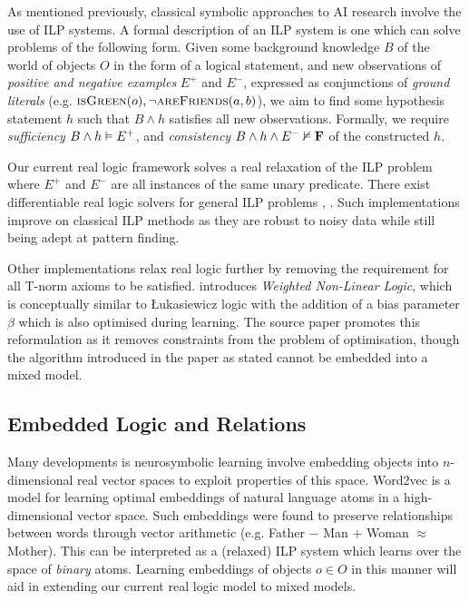 As mentioned previously, classical symbolic approaches to AI research involve the use of ILP systems. A formal description of an ILP system is one which can solve problems of the following form. Given some background knowledge $B$ of the world of objects $O$ in the form of a logical statement, and new observations of \textit{positive and negative examples} $E^+$ and $E^-$, expressed as conjunctions of \textit{ground literals} (e.g. $\textsc{isGreen}(o), \lnot \textsc{areFriends}(a,b)$), we aim to find some hypothesis statement $h$ such that $B \land h$ satisfies all new observations. Formally, we require \textit{sufficiency} $B \land h \vDash E^+$, and \textit{consistency} $B \land h \land E^- \nvDash \textbf{F}$ of the constructed $h$.

Our current real logic framework solves a real relaxation of the ILP problem where $E^+$ and $E^-$ are all instances of the same unary predicate. There exist differentiable real logic solvers for general ILP problems \cite{diffilp}, \cite{diffilpGT}. Such implementations improve on classical ILP methods as they are robust to noisy data while still being adept at pattern finding.

Other implementations relax real logic further by removing the requirement for all T-norm axioms to be satisfied. \cite{lnnibm} introduces \textit{Weighted Non-Linear Logic}, which is conceptually similar to Łukasiewicz logic with the addition of a bias parameter $\beta$ which is also optimised during learning. The source paper promotes this reformulation as it removes constraints from the problem of optimisation, though the algorithm introduced in the paper as stated cannot be embedded into a mixed model.

\subsection{Embedded Logic and Relations}

Many developments is neurosymbolic learning involve embedding objects into $n$-dimensional real vector spaces to exploit properties of this space. Word2vec \cite{word2vec} is a model for learning optimal embeddings of natural language atoms in a high-dimensional vector space. Such embeddings were found to preserve relationships between words through vector arithmetic \cite{word2vecrelations} (e.g. Father $-$ Man $+$ Woman $\approx$ Mother). This can be interpreted as a (relaxed) ILP system which learns over the space of \textit{binary} atoms. Learning embeddings of objects $o \in O$ in this manner will aid in extending our current real logic model to mixed models.

